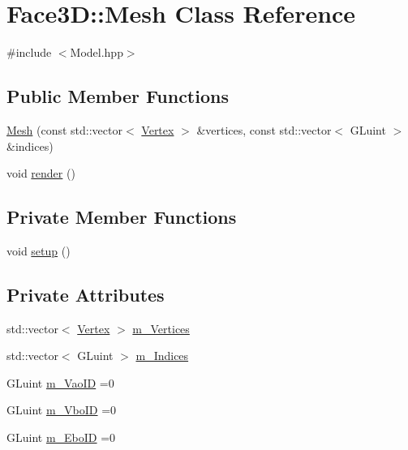 \hypertarget{class_face3_d_1_1_mesh}{}\section{Face3D\+:\+:Mesh Class Reference}
\label{class_face3_d_1_1_mesh}


{\ttfamily \#include $<$Model.\+hpp$>$}

\subsection*{Public Member Functions}
\begin{DoxyCompactItemize}
\item 
\hyperlink{class_face3_d_1_1_mesh_a4f47ad97eb9ae1e999b9d8a4d4fbf9be}{Mesh} (const std\+::vector$<$ \hyperlink{struct_face3_d_1_1_vertex}{Vertex} $>$ \&vertices, const std\+::vector$<$ G\+Luint $>$ \&indices)
\item 
void \hyperlink{class_face3_d_1_1_mesh_acb8245a0c2988983410da0c43f9699f5}{render} ()
\end{DoxyCompactItemize}
\subsection*{Private Member Functions}
\begin{DoxyCompactItemize}
\item 
void \hyperlink{class_face3_d_1_1_mesh_a103b2560543b838b2271a7aeb4377297}{setup} ()
\end{DoxyCompactItemize}
\subsection*{Private Attributes}
\begin{DoxyCompactItemize}
\item 
std\+::vector$<$ \hyperlink{struct_face3_d_1_1_vertex}{Vertex} $>$ \hyperlink{class_face3_d_1_1_mesh_a471af3fd09f58640e4e279d145a7b757}{m\+\_\+\+Vertices}
\item 
std\+::vector$<$ G\+Luint $>$ \hyperlink{class_face3_d_1_1_mesh_ade1ee09c57f88c22ca5f49d5779d6db7}{m\+\_\+\+Indices}
\item 
G\+Luint \hyperlink{class_face3_d_1_1_mesh_a1fee49a00035fde16a18d4befc261a05}{m\+\_\+\+Vao\+ID} =0
\item 
G\+Luint \hyperlink{class_face3_d_1_1_mesh_a1dcd0d3819ab75aac1dd9762048d2a3f}{m\+\_\+\+Vbo\+ID} =0
\item 
G\+Luint \hyperlink{class_face3_d_1_1_mesh_a38779bcc6db79f6a1a30ab66bde3680f}{m\+\_\+\+Ebo\+ID} =0
\end{DoxyCompactItemize}


